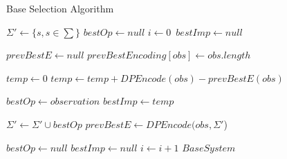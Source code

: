 \begin{algorithm}
\caption{Base Selection Algorithm}
\label{Base Selection}
\begin{algorithmic}[1]
\State $\Sigma' \gets \{s, s \in \sum \}$
\State $bestOp \gets null$
\State $i\gets 0$\
\State $bestImp \gets null$

\State $prevBestE \gets null$
	\State $prevBestEncoding[obs] \gets obs.length$
\EndFor

		\State $temp \gets 0$
			\State $temp \gets temp + DPEncode(obs) - prevBestE(obs)$
		\EndFor
		
			\State $bestOp \gets observation$
			\State $bestImp \gets temp$
		\EndIf
		
	
		
	\EndFor

	\State $\Sigma' \gets \Sigma' \cup bestOp$
		\State $prevBestE \gets DPEncode(obs,\Sigma'$) 
	\EndFor	
	
	\State $bestOp \gets null$
	\State $bestImp \gets null$
	\State $i \gets i + 1$
\EndWhile 
\Return $BaseSystem$

\EndProcedure
\end{algorithmic}
\end{algorithm}

